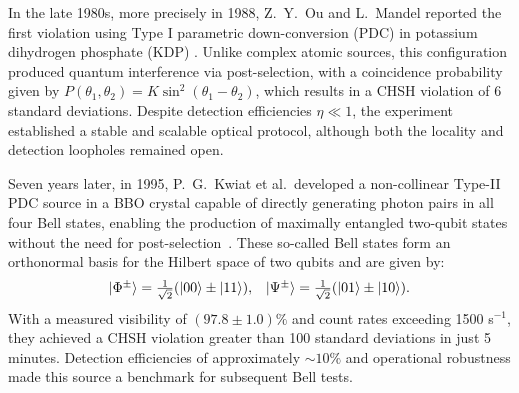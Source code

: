 \documentclass[aps,pra,reprint, superscriptaddress,showkeys]{revtex4-2}
\theoremstyle{plain}
\begin{document}

In the late 1980s, more precisely in 1988, Z.~Y.~Ou and L.~Mandel reported the first violation using Type I parametric down-conversion (PDC) in potassium dihydrogen phosphate (KDP) \cite{Mandel88}. Unlike complex atomic sources, this configuration produced quantum interference via post-selection, with a coincidence probability given by $P(\theta_1, \theta_2) = K \sin^2(\theta_1 - \theta_2)$, which results in a CHSH violation of 6 standard deviations. Despite detection efficiencies $\eta \ll 1$, the experiment established a stable and scalable optical protocol, although both the locality and detection loopholes remained open.

Seven years later, in 1995, P.~G.~Kwiat et al.\  developed a non-collinear Type-II PDC source in a BBO crystal capable of directly generating photon pairs in all four Bell states, enabling the production of maximally entangled two-qubit states without the need for post-selection~\cite{Kwiat1995}. These so-called Bell states form an orthonormal basis for the Hilbert space of two qubits and are given by:
\begin{equation}
\begin{array}{r@{\quad}r}
|\Phi^\pm\rangle = \frac{1}{\sqrt{2}} (|00\rangle \pm |11\rangle), &
|\Psi^\pm\rangle = \frac{1}{\sqrt{2}} (|01\rangle \pm |10\rangle).
\end{array}
\end{equation}
With a measured visibility of $(97.8 \pm 1.0)\%$ and count rates exceeding 1500 s$^{-1}$, they achieved a CHSH violation greater than 100 standard deviations in just 5 minutes. Detection efficiencies of approximately $\sim10\%$ and operational robustness made this source a benchmark for subsequent Bell tests.
\end{document}
